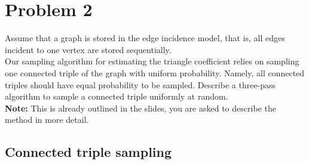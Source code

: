 
\section{Problem 2}

Assume that a graph is stored in the edge incidence model, that is, all edges incident to one vertex are stored sequentially.\\
Our sampling algorithm for estimating the triangle coefficient relies on sampling one connected triple of the graph with uniform probability. Namely, all connected triples should have equal probability to be sampled. Describe a three-pass algorithm to sample a connected triple uniformly at random.\\
\textbf{Note:} This is already outlined in the slides, you are asked to describe the method in more detail.

\subsection{Connected triple sampling}

